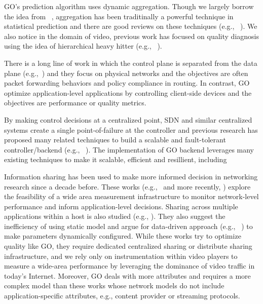  GO's prediction algorithm uses dynamic aggregation. Though we largely borrow the idea from ~\cite{george2008value}, aggregation has been traditinally a powerful technique in statistical prediction and there are good reviews on these techniques (e.g., ~\cite{stemm2000network}). We also notice in the domain of video, previous work has focused on quality diagnosis using the idea of hierarchical heavy hitter (e.g., ~\cite{hhh,iptv-sigcomm09}).


 There is a long line of work in which the control plane is separated from the data plane (e.g.,~\cite{rcp,onix,yan2007tesseract,openflow}) and they focus on physical networks and the objectives are often packet forwarding behaviors and policy compliance in routing. In contrast, GO optimize application-level applications by controlling client-side devices and the objectives are performance or quality metrics.  

 By making control decisions at a centralized point, SDN and similar centralized systems create a single point-of-failure at the controller and previous research has proposed many related techniques to build a scalable and fault-tolerant controller/backend (e.g., ~\cite{tootoonchian2012controller,yan2007tesseract}). The implementation of GO backend leverages many existing techniques to make it scalable, efficient and resillient, including ~\cite{spark,hadoop,zaharia2012resilient,kreps2011kafka}

 Information sharing has been used to make more informed decision in networking research since a decade before. These works (e.g.,~\cite{stemm2000network} and more recently, \cite{choffnes2010crowdsourcing}) explore the feasibility of a wide area measurement infrastructure to monitor network-level performance and inform application-level decisions. Sharing across multiple applications within a host is also studied (e.g., \cite{balakrishnan1999integrated}). They also suggest the inefficiency of using static model and argue for data-driven approach (e.g., ~\cite{Winstein:2013:TEM:2486001.2486020, sivaraman2013no}) to make parameters dynamically configured.
While these works try to optimize quality like GO, they require dedicated centralized sharing or distribute sharing infrastructure, and we rely only on instrumentation within video players to measure a wide-area performance by leveraging the dominance of video traffic in today's Internet. Moreover, GO deals with more attributes and requires a more complex model than these works whose network models do not include application-specific attributes, e.g., content provider or streaming protocols. 

